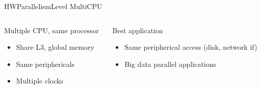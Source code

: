 %
\begin{Frame}{HWParallelismLevel MultiCPU}
  \begin{columns}[t]
    \begin{column}{\HW} %
      \begin{block}{Multiple CPU, same processor}
        \begin{itemize}
        \item Share L3, global memory
        \item Same periphericals
        \item Multiple clocks
        \end{itemize}
      \end{block} 
    \end{column}
    
    \begin{column}{\HW} %
      \begin{block}{Best application}
        \begin{itemize}
        \item Same peripherical access (disk, network if)
        \item Big data parallel applications
        \end{itemize}
      \end{block}   
    \end{column}
  \end{columns}  
\end{Frame}


